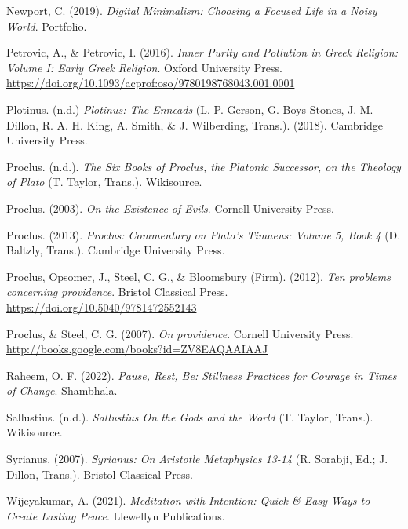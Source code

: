 \documentclass[
]{book}
\begin{document}
Newport, C. (2019). \emph{Digital Minimalism: Choosing a Focused Life in a Noisy World}. Portfolio.

Petrovic, A., \& Petrovic, I. (2016). \emph{Inner Purity and Pollution in Greek Religion: Volume I: Early Greek Religion}. Oxford University Press. \url{https://doi.org/10.1093/acprof:oso/9780198768043.001.0001}

Plotinus. (n.d.) \emph{Plotinus: The Enneads} (L. P. Gerson, G. Boys-Stones, J. M. Dillon, R. A. H. King, A. Smith, \& J. Wilberding, Trans.). (2018). Cambridge University Press.

Proclus. (n.d.). \emph{The Six Books of Proclus, the Platonic Successor, on the Theology of Plato} (T. Taylor, Trans.). Wikisource.

Proclus. (2003). \emph{On the Existence of Evils}. Cornell University Press.

Proclus. (2013). \emph{Proclus: Commentary on Plato's Timaeus: Volume 5, Book 4} (D. Baltzly, Trans.). Cambridge University Press.

Proclus, Opsomer, J., Steel, C. G., \& Bloomsbury (Firm). (2012). \emph{Ten problems concerning providence}. Bristol Classical Press. \url{https://doi.org/10.5040/9781472552143}

Proclus, \& Steel, C. G. (2007). \emph{On providence}. Cornell University Press. \url{http://books.google.com/books?id=ZV8EAQAAIAAJ}

Raheem, O. F. (2022). \emph{Pause, Rest, Be: Stillness Practices for Courage in Times of Change}. Shambhala.

Sallustius. (n.d.). \emph{Sallustius On the Gods and the World} (T. Taylor, Trans.). Wikisource.

Syrianus. (2007). \emph{Syrianus: On Aristotle Metaphysics 13-14} (R. Sorabji, Ed.; J. Dillon, Trans.). Bristol Classical Press.

Wijeyakumar, A. (2021). \emph{Meditation with Intention: Quick \& Easy Ways to Create Lasting Peace}. Llewellyn Publications.
\end{document}
